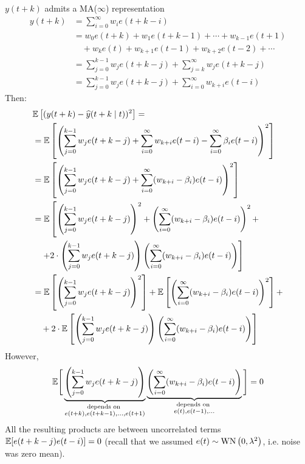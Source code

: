 $y(t+k)$ admits a MA($\infty$) representation
\begin{align*}
	y(t+k)&= \sum_{i=0}^{\infty} w_{i} e(t+k-i) \\
	&= w_{0} e(t+k)+w_{1} e(t+k-1)+\cdots+w_{k-1} e(t+1)\\
	&\quad + w_{k} e(t) + w_{k+1} e(t-1) + w_{k+2} e(t-2) + \cdots\\
	&=\sum_{j=0}^{k-1} w_{j} e(t+k-j)+\sum_{j=k}^{\infty} w_{j} e(t+k-j) \\
	&=\sum_{j=0}^{k-1} w_{j} e(t+k-j)+\sum_{i=0}^{\infty} w_{k+i} e(t-i)
\end{align*}
Then:
\begin{align*}
	&\mathbb{E}\left[(y(t+k)-\widehat{y}(t+k \mid t))^{2}\right]= \\
	&=\mathbb{E}\left[\left(\sum_{j=0}^{k-1} w_{j} e(t+k-j)+\sum_{i=0}^{\infty} w_{k+i} e(t-i)-\sum_{i=0}^{\infty} \beta_{i} e(t-i)\right)^{2}\right]\\
	&=\mathbb{E}\left[\left(\sum_{j=0}^{k-1} w_{j} e(t+k-j)+\sum_{i=0}^{\infty} (w_{k+i}-\beta_{i}) e(t-i)\right)^{2}\right]\\
	&=\mathbb{E}\left[\left(\sum_{j=0}^{k-1} w_{j} e(t+k-j)\right)^{2}+\left(\sum_{i=0}^{\infty} (w_{k+i}-\beta_{i}) e(t-i)\right)^{2}+\right.\\
	&\quad\left.+2\cdot\left(\sum_{j=0}^{k-1} w_{j} e(t+k-j)\right)\left(\sum_{i=0}^{\infty} (w_{k+i}-\beta_{i}) e(t-i)\right)\right]\\
	&= \mathbb{E}\left[\left(\sum_{j=0}^{k-1} w_{j} e(t+k-j)\right)^{2}\right]+\mathbb{E}\left[\left(\sum_{i=0}^{\infty} (w_{k+i}-\beta_{i}) e(t-i)\right)^{2}\right]+\\
	&\quad +2 \cdot \mathbb{E}\left[\left(\sum_{j=0}^{k-1} w_{j} e(t+k-j)\right)\left(\sum_{i=0}^{\infty} (w_{k+i}-\beta_{i}) e(t-i)\right)\right]
\end{align*}
However,
\begin{align*}
	\mathbb{E}\Bigg[\underbrace{\left(\sum_{j=0}^{k-1} w_{j} e(t+k-j)\right)}_{\substack{\text{depends on }\\e(t+k),e(t+k-1),\ldots,e(t+1)}}\underbrace{\left( \sum_{i=0}^{\infty} (w_{k+i}-\beta_{i}) e(t-i)\right)}_{\substack{\text{depends on }\\e(t),e(t-1),\ldots}}\Bigg]=0
\end{align*}
All the resulting products are between uncorrelated terms
$\mathbb{E}[e(t+k-j) e(t-i)]=0$ (recall that we assumed $e(t) \sim \operatorname{WN}\left(0, \lambda^{2}\right)$, i.e.
noise was zero mean).

